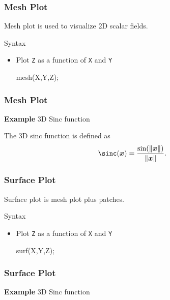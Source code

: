 \documentclass[compress]{beamer}  %
\begin{document}
\begin{frame}[fragile]
\frametitle{Mesh Plot}
Mesh plot is used to visualize 2D scalar fields.
\begin{block}{Syntax}
\begin{itemize}
    \item Plot \texttt{Z} as a function of \texttt{X} and \texttt{Y}
          \begin{matlabcodebeamer}[numbers=none,frame=none]
          mesh(X,Y,Z);
          \end{matlabcodebeamer}
\end{itemize}
\end{block}

\end{frame}
\begin{frame}[fragile]
\frametitle{Mesh Plot}
\textbf{Example} 3D Sinc function

The 3D sinc function is defined as
\begin{equation}
    \sinc(\vx) = \frac{\sin(\| \vx \|)}{\| \vx \|}.
\end{equation}\pause

\setcounter{subfigure}{0}
\begin{figure}
    \centering
\end{figure}

\end{frame}
\begin{frame}[fragile]
\frametitle{Surface Plot}
Surface plot is mesh plot plus patches.
\begin{block}{Syntax}
\begin{itemize}
    \item Plot \texttt{Z} as a function of \texttt{X} and \texttt{Y}
          \begin{matlabcodebeamer}[numbers=none,frame=none]
          surf(X,Y,Z);
          \end{matlabcodebeamer}
\end{itemize}
\end{block}

\end{frame}
\begin{frame}[fragile]
\frametitle{Surface Plot}
\textbf{Example} 3D Sinc function

\setcounter{subfigure}{0}
\begin{figure}
    \centering
\end{figure}

\end{frame}
\end{document}
